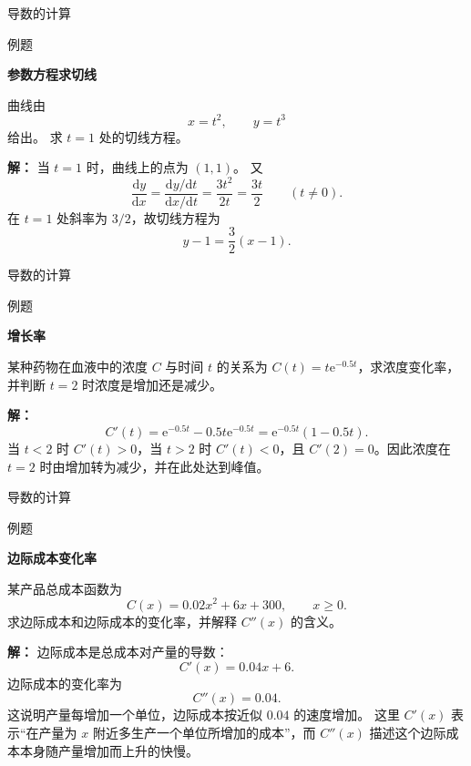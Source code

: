 \documentclass[aspectratio=169,10pt,fontset=fandol]{ctexbeamer}
\newcommand{\dd}{\mathrm{d}}
\newcommand{\ee}{\mathrm{e}}
\begin{document}
\begin{frame}[t,fragile]{导数的计算}
\normalsize
\begin{block}{例题}
{\normalsize
\textbf{参数方程求切线}\par

曲线由
\[
x=t^2,\qquad y=t^3
\]
给出。 求 $t=1$ 处的切线方程。

}
\end{block}
\pause
{\normalsize
\textbf{解：}
当 $t=1$ 时，曲线上的点为 $(1,1)$。 又
\[
\frac{\dd y}{\dd x}
=\frac{\dd y/\dd t}{\dd x/\dd t}
=\frac{3t^2}{2t}
=\frac{3t}{2}\qquad(t\neq0).
\]
在 $t=1$ 处斜率为 $3/2$，故切线方程为
\[
y-1=\frac32(x-1).
\]

}
\end{frame}
\begin{frame}[t,fragile]{导数的计算}
\normalsize
\begin{block}{例题}
{\normalsize
\textbf{增长率}\par

某种药物在血液中的浓度 $C$ 与时间 $t$ 的关系为 $C(t)=t\ee^{-0.5t}$，求浓度变化率，并判断 $t=2$ 时浓度是增加还是减少。

}
\end{block}
\pause
{\normalsize
\textbf{解：}
\[
C'(t)=\ee^{-0.5t}-0.5t\ee^{-0.5t}=\ee^{-0.5t}(1-0.5t).
\]
当 \(t<2\) 时 \(C'(t)>0\)，当 \(t>2\) 时 \(C'(t)<0\)，且 \(C'(2)=0\)。因此浓度在 \(t=2\) 时由增加转为减少，并在此处达到峰值。

}
\end{frame}
\begin{frame}[t,fragile]{导数的计算}
\normalsize
\begin{block}{例题}
{\normalsize
\textbf{边际成本变化率}\par

某产品总成本函数为
\[
C(x)=0.02x^2+6x+300,\qquad x\geq0.
\]
求边际成本和边际成本的变化率，并解释 $C''(x)$ 的含义。

}
\end{block}
\pause
{\normalsize
\textbf{解：}
边际成本是总成本对产量的导数：
\[
C'(x)=0.04x+6.
\]
边际成本的变化率为
\[
C''(x)=0.04.
\]
这说明产量每增加一个单位，边际成本按近似 $0.04$ 的速度增加。 这里 $C'(x)$ 表示“在产量为 $x$ 附近多生产一个单位所增加的成本”，而 $C''(x)$ 描述这个边际成本本身随产量增加而上升的快慢。

}
\end{frame}
\end{document}
